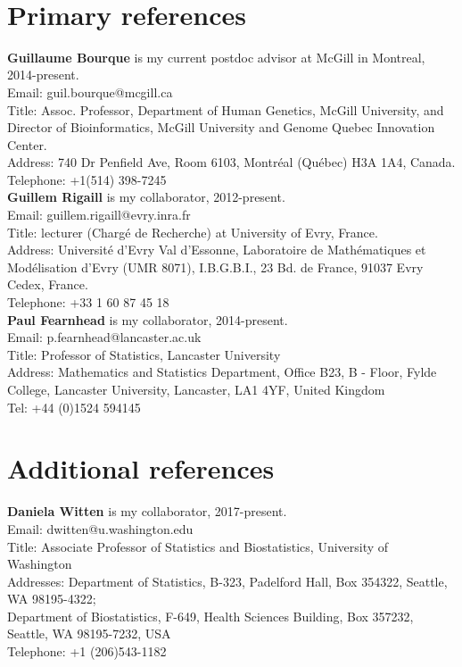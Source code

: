 \documentclass{article}
\begin{document}
\mbox{ }
\setlength{\parindent}{0cm}

\section*{Primary references}

{\bf Guillaume Bourque} is my current postdoc advisor at McGill in Montreal, 2014-present.\\
Email: guil.bourque@mcgill.ca\\
Title: Assoc. Professor, Department of Human Genetics, McGill University, and\\
Director of Bioinformatics, McGill University and Genome Quebec Innovation Center. \\
Address: 740 Dr Penfield Ave, Room 6103, Montréal (Québec) H3A 1A4, Canada.\\
Telephone: +1(514) 398-7245\\

{\bf Guillem Rigaill} is my collaborator, 2012-present.\\
Email: guillem.rigaill@evry.inra.fr\\
Title: lecturer (Charg\'e de Recherche) at University of Evry, France.\\
Address: Universit\'e d'Evry Val d'Essonne,
Laboratoire de Math\'ematiques et Mod\'elisation d'Evry (UMR 8071),
I.B.G.B.I., 23 Bd. de France, 91037 Evry Cedex,
France.\\
Telephone: +33 1 60 87 45 18\\

{\bf Paul Fearnhead} is my collaborator, 2014-present.\\
Email: p.fearnhead@lancaster.ac.uk\\
Title: Professor of Statistics, Lancaster University\\
Address: Mathematics and Statistics Department,
Office B23, B - Floor, Fylde College,
Lancaster University,
Lancaster, LA1 4YF,
United Kingdom\\
Tel: +44 (0)1524 594145\\

\section*{Additional references}

{\bf Daniela Witten} is my collaborator, 2017-present.\\
Email: dwitten@u.washington.edu\\
Title: Associate Professor of Statistics and Biostatistics, University of Washington\\
Addresses:
Department of Statistics,
B-323, Padelford Hall, Box 354322,
Seattle, WA 98195-4322;\\
Department of Biostatistics,
F-649, Health Sciences Building, Box 357232,
Seattle, WA 98195-7232,
USA\\
Telephone: +1 (206)543-1182\\
\end{document}
